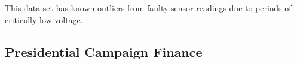 \documentclass{vldb}
\begin{document}
This data set has known outliers from faulty sensor readings due to periods of critically low voltage.

\subsection{Presidential Campaign Finance}
\cite{PresCampaignData}






\end{document}
